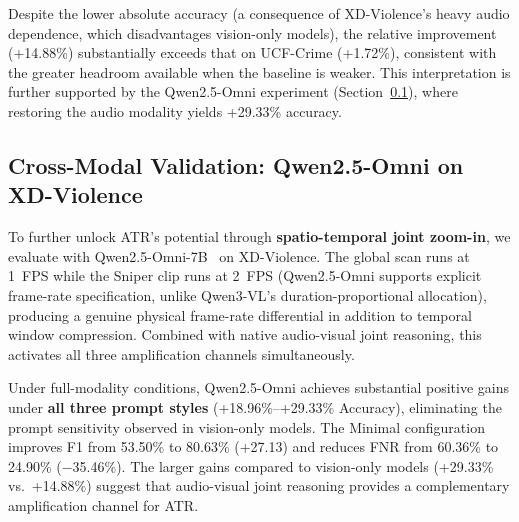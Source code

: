 Despite the lower absolute accuracy (a consequence of XD-Violence's heavy audio dependence, which disadvantages vision-only models), the relative improvement (+14.88\%) substantially exceeds that on UCF-Crime (+1.72\%), consistent with the greater headroom available when the baseline is weaker. This interpretation is further supported by the Qwen2.5-Omni experiment (Section~\ref{sec:omni}), where restoring the audio modality yields +29.33\% accuracy.


\subsection{Cross-Modal Validation: Qwen2.5-Omni on XD-Violence}
\label{sec:omni}

To further unlock ATR's potential through \textbf{spatio-temporal joint zoom-in}, we evaluate with Qwen2.5-Omni-7B~\cite{xu2025qwenomni} on XD-Violence. The global scan runs at 1~FPS while the Sniper clip runs at 2~FPS (Qwen2.5-Omni supports explicit frame-rate specification, unlike Qwen3-VL's duration-proportional allocation), producing a genuine physical frame-rate differential in addition to temporal window compression. Combined with native audio-visual joint reasoning, this activates all three amplification channels simultaneously.

\begin{table}[t]
  \centering
  \caption{Qwen2.5-Omni-7B on XD-Violence ($N$=800): 3 prompt styles.}
  \label{tab:omni}
\end{table}

Under full-modality conditions, Qwen2.5-Omni achieves substantial positive gains under \textbf{all three prompt styles} (+18.96\%--+29.33\% Accuracy), eliminating the prompt sensitivity observed in vision-only models. The Minimal configuration improves F1 from 53.50\% to 80.63\% (+27.13) and reduces FNR from 60.36\% to 24.90\% ($-$35.46\%). The larger gains compared to vision-only models (+29.33\% vs.\ +14.88\%) suggest that audio-visual joint reasoning provides a complementary amplification channel for ATR.


